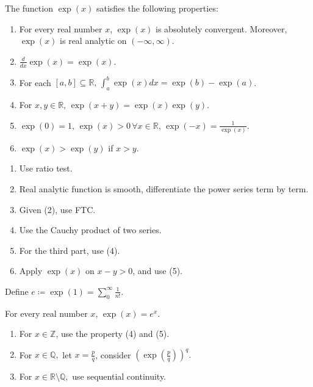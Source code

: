 \documentclass[12pt]{article}
\begin{document}
\begin{property}
    The function $\exp(x)$ satisfies the following properties:
    \begin{enumerate}
        \item For every real number $x$, $\exp(x)$ is absolutely convergent. Moreover, $\exp(x)$ is real analytic on $(-\infty, \infty)$.
        \item $\frac{d}{dx}\exp(x)=\exp(x).$
        \item For each $[a,b]\subseteq \mathbb{R},\, \int_{a}^{b}\exp(x)dx = \exp(b)-\exp(a)$.
        \item For $x,y\in\mathbb{R},\, \exp(x+y)=\exp(x)\exp(y).$
        \item $\exp(0)=1,\,\exp(x)>0\,\forall x\in\mathbb{R},\, \exp(-x)=\frac{1}{\exp(x)}$.
        \item $\exp(x)>\exp(y)$ if $x>y$.
    \end{enumerate}
\end{property}


\begin{pfbox}
    \begin{enumerate}
        \item Use ratio test.
        \item Real analytic function is smooth, differentiate the power series term by term.
        \item Given (2), use FTC.
        \item Use the Cauchy product of two series.
        \item For the third part, use (4).
        \item Apply $\exp(x)$ on $x-y>0$, and use (5). 
    \end{enumerate}
\end{pfbox}


\begin{definition}
    Define $e\coloneq \exp(1)=\sum_{0}^{\infty}\frac{1}{n!}$.
\end{definition}

\begin{theorem}
    For every real number $x$, $\exp(x)=e^x$.
\end{theorem}

\begin{pfbox}
    \begin{enumerate}
        \item For $x\in\mathbb{Z}$, use the property (4) and (5).
        \item For $x\in\mathbb{Q},$ let $x=\frac{p}{q}$, consider $(\exp(\frac{p}{q}))^q.$
        \item For $x\in\mathbb{R}\setminus\mathbb{Q},$ use sequential continuity.
    \end{enumerate}
\end{pfbox}
\end{document}
